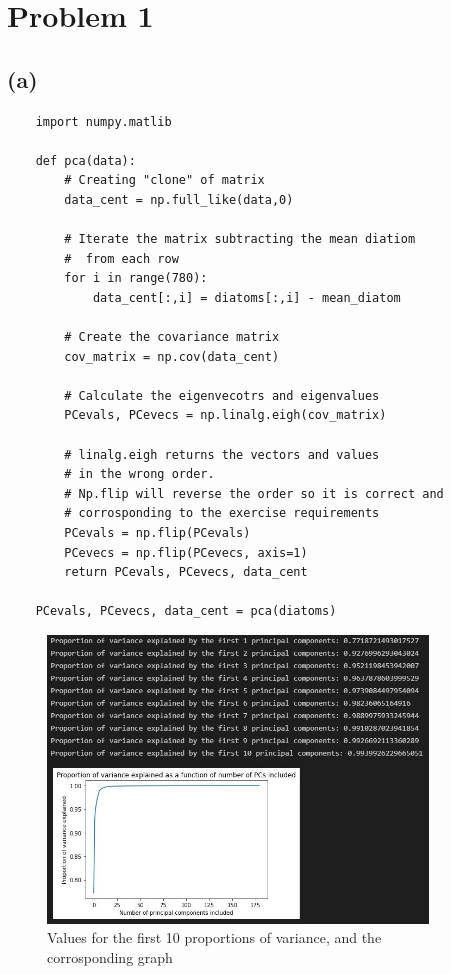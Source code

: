 \section{Problem 1}
\subsection{(a)}

\begin{verbatim}
    import numpy.matlib

    def pca(data):
        # Creating "clone" of matrix
        data_cent = np.full_like(data,0) 

        # Iterate the matrix subtracting the mean diatiom
        #  from each row
        for i in range(780):
            data_cent[:,i] = diatoms[:,i] - mean_diatom

        # Create the covariance matrix
        cov_matrix = np.cov(data_cent)

        # Calculate the eigenvecotrs and eigenvalues
        PCevals, PCevecs = np.linalg.eigh(cov_matrix)
        
        # linalg.eigh returns the vectors and values 
        # in the wrong order.
        # Np.flip will reverse the order so it is correct and
        # corrosponding to the exercise requirements
        PCevals = np.flip(PCevals)
        PCevecs = np.flip(PCevecs, axis=1)
        return PCevals, PCevecs, data_cent

    PCevals, PCevecs, data_cent = pca(diatoms)
\end{verbatim}

\begin{figure}[H]
    \centering
    \includegraphics[width=0.9\textwidth]{Figures/Proportion_of_variance.JPG}
    \caption{Values for the first 10 proportions of variance, and the corrosponding graph}
\end{figure}

